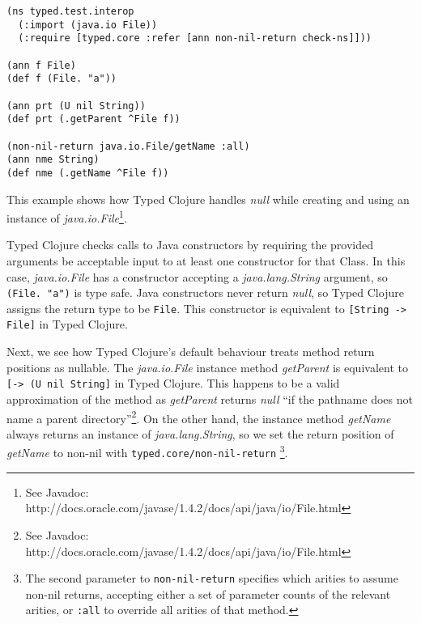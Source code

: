 \begin{lstlisting}
(ns typed.test.interop
  (:import (java.io File))
  (:require [typed.core :refer [ann non-nil-return check-ns]]))

(ann f File)
(def f (File. "a"))

(ann prt (U nil String))
(def prt (.getParent ^File f))

(non-nil-return java.io.File/getName :all)
(ann nme String)
(def nme (.getName ^File f))

\end{lstlisting}

This example shows how Typed Clojure handles \emph{null} while creating and
using an instance of \emph{java.io.File}\footnote{See Javadoc: http://docs.oracle.com/javase/1.4.2/docs/api/java/io/File.html}.

Typed Clojure checks calls to Java constructors by requiring the provided
arguments be acceptable input to at least one constructor for that Class.
In this case, \emph{java.io.File} has a constructor accepting a \emph{java.lang.String}
argument, so \lstinline|(File. "a")| is type safe. Java constructors never
return \emph{null}, so Typed Clojure assigns the return type to be \lstinline|File|.
This constructor is equivalent to \lstinline|[String -> File]| in Typed Clojure.

Next, we see how Typed Clojure's default behaviour treats method return positions as nullable.
The \emph{java.io.File} instance method \emph{getParent}
is equivalent to \lstinline|[-> (U nil String]| in Typed Clojure. This happens to be
a valid approximation of the method as \emph{getParent} returns \emph{null} 
``if the pathname does not name a parent directory''\footnote{See Javadoc: http://docs.oracle.com/javase/1.4.2/docs/api/java/io/File.html}.
On the other hand, the instance method \emph{getName} always returns an
instance of \emph{java.lang.String}, so we set the return position of
\emph{getName} to non-nil with \lstinline|typed.core/non-nil-return|
\footnote{The second parameter to \lstinline|non-nil-return| specifies which arities to assume non-nil 
returns, accepting either a set of parameter counts of the relevant arities, or \lstinline|:all|
to override all arities of that method.}.
